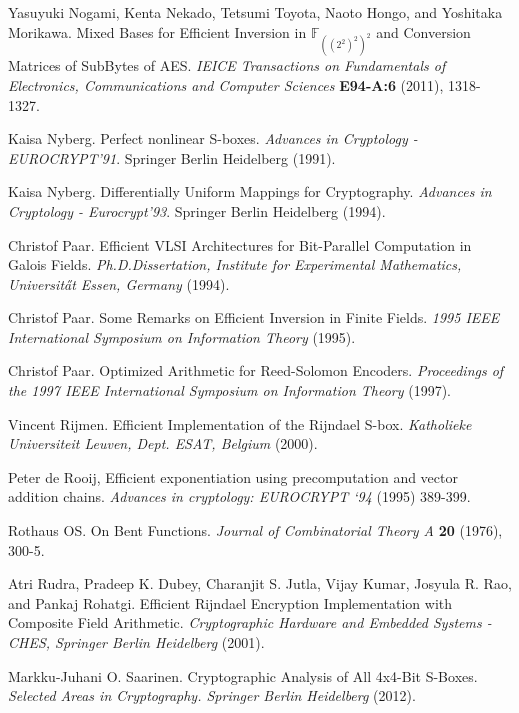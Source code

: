 \documentclass[11pt,american]{report}
\begin{document}
\begin{thebibliography}{9}
 Yasuyuki Nogami, Kenta Nekado, Tetsumi Toyota, Naoto Hongo, and Yoshitaka Morikawa. Mixed Bases for Efficient Inversion in $\mathbb{F}_{((2^2)^2)^2}$ and Conversion Matrices of SubBytes of AES. \emph{IEICE Transactions on Fundamentals of Electronics, Communications and Computer Sciences} \textbf{E94-A:6} (2011), 1318-1327.

 Kaisa Nyberg. Perfect nonlinear S-boxes. \emph{Advances in Cryptology - EUROCRYPT’91}. Springer Berlin Heidelberg (1991).

 Kaisa Nyberg. Differentially Uniform Mappings for Cryptography. \emph{Advances in Cryptology - Eurocrypt’93}. Springer Berlin Heidelberg (1994).



 Christof Paar. Efficient VLSI Architectures for Bit-Parallel Computation in Galois Fields. \emph{Ph.D.Dissertation, Institute for Experimental Mathematics, Universit\H{a}t Essen, Germany} (1994).

 Christof Paar. Some Remarks on Efficient Inversion in Finite Fields. \emph{1995 IEEE International Symposium on Information Theory} (1995).

 Christof Paar. Optimized Arithmetic for Reed-Solomon Encoders. \emph{Proceedings of the 1997 IEEE International Symposium on Information Theory} (1997).



 Vincent Rijmen. Efficient Implementation of the Rijndael S-box. \emph{Katholieke Universiteit Leuven, Dept. ESAT, Belgium} (2000).

 Peter de Rooij, Efficient exponentiation using precomputation and vector addition chains. \emph{Advances in cryptology: EUROCRYPT `94} (1995) 389-399. 

 Rothaus OS. On Bent Functions. \emph{Journal of Combinatorial Theory A} \textbf{20} (1976), 300-5.

 Atri Rudra, Pradeep K. Dubey, Charanjit S. Jutla, Vijay Kumar, Josyula R. Rao, and Pankaj Rohatgi. Efficient Rijndael Encryption Implementation with Composite Field Arithmetic. \emph{Cryptographic Hardware and Embedded Systems - CHES, Springer Berlin Heidelberg} (2001).

 Markku-Juhani O. Saarinen. Cryptographic Analysis of All 4x4-Bit S-Boxes. \emph{Selected Areas in Cryptography. Springer Berlin Heidelberg} (2012).


\end{thebibliography}
\end{document}
